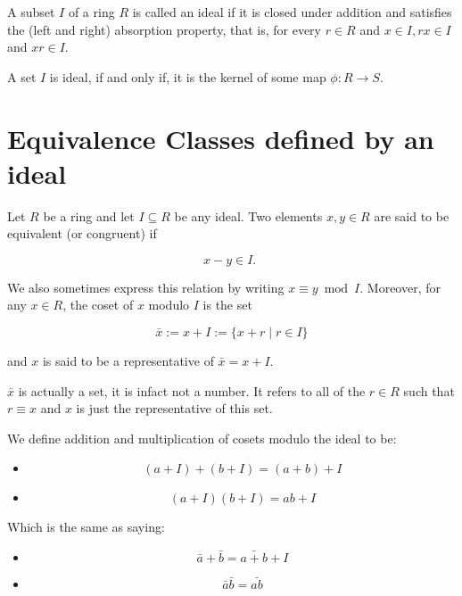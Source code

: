 \begin{definition}[Ideal]
A subset \(I\) of a ring \(R\) is called an ideal if it is closed under addition and satisfies the (left and right) absorption property, that is, for every \(r \in R\) and \(x \in I, r x \in I\) and \(x r \in I\).
\end{definition}
    
\begin{lemma}
  A set \(I\) is ideal, if and only if,  it is the kernel of some map \(\phi : R \rightarrow S \).
\end{lemma}

\section{Equivalence Classes defined by an ideal}

\begin{definition}
Let \(R\) be a ring and let \(I \subseteq R\) be any ideal. Two elements \(x, y \in R\) are said to be equivalent (or congruent) if

\[
x-y \in I \text {. }
\]

We also sometimes express this relation by writing \(x \equiv y \bmod I\). Moreover, for any \(x \in R\), the coset of \(x\) modulo \(I\) is the set

\[
\bar{x}:=x+I:=\{x+r \mid r \in I\}
\]

and \(x\) is said to be a representative of \(\bar{x}=x+I\).
\end{definition}

\begin{remark}
\(\bar{x}\) is actually a set, it is infact not a number. It refers to all of the \(r \in R\) such that \(r \equiv x\) and \(x\) is just the representative of this set. 
\end{remark}

\begin{proposition}
  We define addition and multiplication of cosets modulo the ideal to be:

  \begin{itemize}
    \item \[(a+I) + (b+I) = (a+b) + I\]
    \item \[(a+I)(b+I) = ab+I\]
  \end{itemize}

  Which is the same as saying:

  \begin{itemize}
    \item \[\bar{ a }+ \bar{ b } = \bar{a+b} + I\]
    \item \[\bar{a}\bar{b}=\bar{ab}\]
  \end{itemize} 

\end{proposition}


